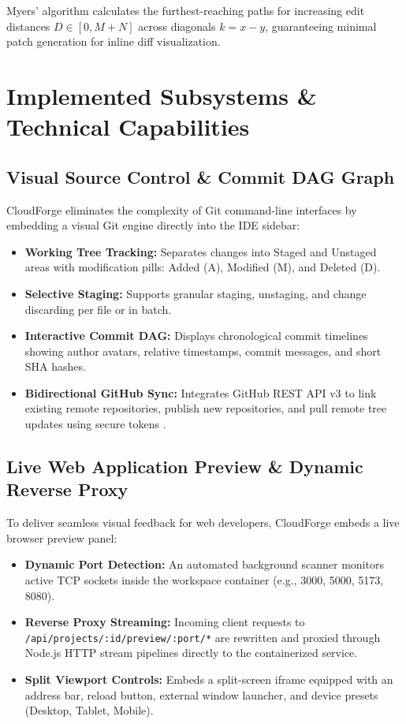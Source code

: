 \documentclass[conference]{IEEEtran}
\begin{document}
Myers' algorithm calculates the furthest-reaching paths for increasing edit distances $D \in [0, M+N]$ across diagonals $k = x - y$, guaranteeing minimal patch generation for inline diff visualization.

\section{Implemented Subsystems \& Technical Capabilities}

\subsection{Visual Source Control \& Commit DAG Graph}
CloudForge eliminates the complexity of Git command-line interfaces by embedding a visual Git engine directly into the IDE sidebar:
\begin{itemize}
    \item \textbf{Working Tree Tracking:} Separates changes into Staged and Unstaged areas with modification pills: Added (A), Modified (M), and Deleted (D).
    \item \textbf{Selective Staging:} Supports granular staging, unstaging, and change discarding per file or in batch.
    \item \textbf{Interactive Commit DAG:} Displays chronological commit timelines showing author avatars, relative timestamps, commit messages, and short SHA hashes.
    \item \textbf{Bidirectional GitHub Sync:} Integrates GitHub REST API v3 to link existing remote repositories, publish new repositories, and pull remote tree updates using secure tokens \cite{chacon2014}.
\end{itemize}

\subsection{Live Web Application Preview \& Dynamic Reverse Proxy}
To deliver seamless visual feedback for web developers, CloudForge embeds a live browser preview panel:
\begin{itemize}
    \item \textbf{Dynamic Port Detection:} An automated background scanner monitors active TCP sockets inside the workspace container (e.g., 3000, 5000, 5173, 8080).
    \item \textbf{Reverse Proxy Streaming:} Incoming client requests to \texttt{/api/projects/:id/preview/:port/*} are rewritten and proxied through Node.js HTTP stream pipelines directly to the containerized service.
    \item \textbf{Split Viewport Controls:} Embeds a split-screen iframe equipped with an address bar, reload button, external window launcher, and device presets (Desktop, Tablet, Mobile).
\end{itemize}
\end{document}
